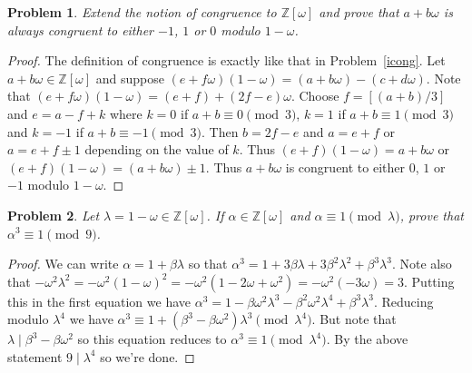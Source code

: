 \documentclass{article}
\newtheorem{problem}{Problem}
\begin{document}
\begin{problem}
\label{omegacong}
Extend the notion of congruence to $\mathbb{Z}[\omega]$ and prove that $a + b \omega$ is always congruent to either $-1$, $1$ or $0$ modulo $1 - \omega$.
\end{problem}
\begin{proof}
The definition of congruence is exactly like that in Problem~\ref{icong}. Let $a + b \omega \in \mathbb{Z}[\omega]$ and suppose $(e + f \omega)(1 - \omega) = (a + b \omega) - (c + d \omega)$. Note that $(e + f \omega)(1 - \omega) = (e + f) + (2f - e) \omega$. Choose $f = [(a+b)/3]$ and $e = a - f + k$ where $k = 0$ if $a + b \equiv 0 \pmod{3}$, $k = 1$ if $a+b \equiv 1 \pmod{3}$ and $k = -1$ if $a + b \equiv -1 \pmod{3}$. Then $b = 2f - e$ and $a = e + f$ or $a = e + f \pm 1$ depending on the value of $k$. Thus $(e + f)(1 - \omega) = a + b \omega$ or $(e + f)(1 - \omega) = (a + b \omega) \pm 1$. Thus $a + b \omega$ is congruent to either $0$, $1$ or $-1$ modulo $1 - \omega$.
\end{proof}

\begin{problem}
\label{cube}
Let $\lambda = 1 - \omega \in \mathbb{Z}[\omega]$. If $ \alpha \in \mathbb{Z}[\omega]$ and $\alpha \equiv 1 \pmod{\lambda}$, prove that $\alpha^3 \equiv 1 \pmod{9}$.
\end{problem}
\begin{proof}
We can write $\alpha = 1 + \beta \lambda$ so that $\alpha^3 = 1 + 3\beta \lambda + 3\beta^2\lambda^2 + \beta^3 \lambda^3$. Note also that $-\omega^2\lambda^2 = -\omega^2(1-\omega)^2 = -\omega^2(1 - 2 \omega + \omega^2) = -\omega^2(-3\omega) = 3$. Putting this in the first equation we have $\alpha^3 = 1 - \beta \omega^2 \lambda^3 - \beta^2\omega^2\lambda^4 + \beta^3 \lambda^3$. Reducing modulo $\lambda^4$ we have $\alpha^3 \equiv 1 + (\beta^3 - \beta \omega^2)\lambda^3 \pmod{\lambda^4}$. But note that $\lambda \mid \beta^3 - \beta \omega^2$ so this equation reduces to $\alpha^3 \equiv 1 \pmod{\lambda^4}$. By the above statement $9 \mid \lambda^4$ so we're done.
\end{proof}
\end{document}
